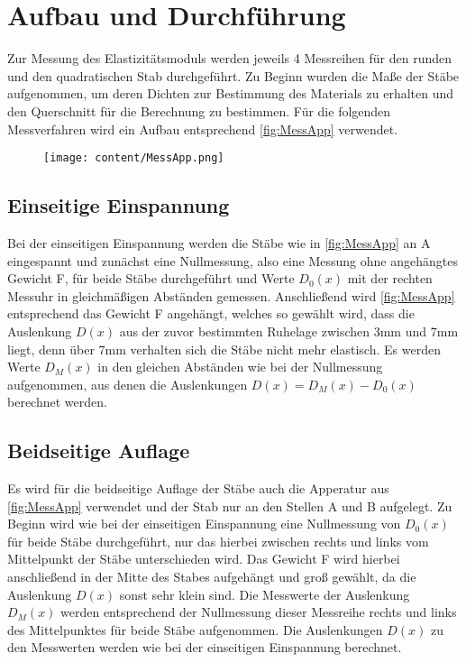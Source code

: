 \section{Aufbau und Durchführung}
\label{sec:Durchführung}
Zur Messung des Elastizitätsmoduls werden jeweils 4 Messreihen für den runden und den quadratischen Stab durchgeführt.
Zu Beginn wurden die Maße der Stäbe aufgenommen, um deren Dichten zur Bestimmung des Materials zu erhalten und den Querschnitt
für die Berechnung zu bestimmen. Für die folgenden Messverfahren wird ein Aufbau entsprechend \autoref{fig:MessApp} verwendet.
\begin{figure}[H]
    \centering
    \texttt{[image: content/MessApp.png]}
    \label{fig:MessApp}
\end{figure}
\subsection{Einseitige Einspannung}
\label{subsec:EinseitigeEinspannungAuD}
Bei der einseitigen Einspannung werden die Stäbe wie in \autoref{fig:MessApp} an A eingespannt und zunächst eine Nullmessung, also
eine Messung ohne angehängtes Gewicht F, für beide Stäbe durchgeführt und Werte $D_0(x)$ mit der rechten Messuhr in gleichmäßigen Abständen gemessen.
Anschließend wird \autoref{fig:MessApp} entsprechend das Gewicht F angehängt, welches so gewählt wird, dass die Auslenkung $D(x)$
aus der zuvor bestimmten Ruhelage zwischen $3\unit{\milli\meter}$ und $7\unit{\milli\meter}$
liegt, denn über $7\unit{\milli\meter}$ verhalten sich die Stäbe nicht mehr elastisch. Es werden Werte $D_M(x)$ in den gleichen Abständen wie bei der Nullmessung aufgenommen,
aus denen die Auslenkungen $D(x) = D_M(x) - D_0(x)$ berechnet werden.
\subsection{Beidseitige Auflage}
\label{subsec:BeidseitigeAuflageDurchf}
Es wird für die beidseitige Auflage der Stäbe auch die Apperatur aus \autoref{fig:MessApp} verwendet und der Stab nur an den Stellen A und B aufgelegt.
Zu Beginn wird wie bei der einseitigen Einspannung eine Nullmessung von $D_0(x)$ für beide Stäbe durchgeführt, nur das hierbei zwischen rechts und links vom
Mittelpunkt der Stäbe unterschieden wird. Das Gewicht F wird hierbei anschließend in der Mitte des Stabes aufgehängt und groß gewählt, da die Auslenkung $D(x)$
sonst sehr klein sind. Die Messwerte der Auslenkung $D_M(x)$ werden entsprechend der Nullmessung dieser Messreihe rechts und links des Mittelpunktes für beide
Stäbe aufgenommen. Die Auslenkungen $D(x)$ zu den Messwerten werden wie bei der einseitigen Einspannung berechnet.
